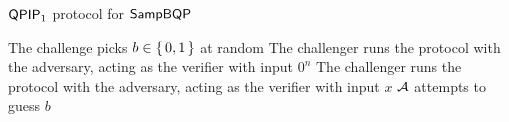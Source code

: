 \begin{algorithm}
	\caption{ $\operatorname{\mathsf{QPIP}}_1$ protocol for $\operatorname{\mathsf{SampBQP}}$}
	\label{ProtoIndCPA}
	\begin{algorithmic}[1]
		\State The challenge picks $b\in\set{0,1}$ at random
			\State The challenger runs the protocol with the adversary, acting as the verifier with input $0^n$
		\Else
			\State The challenger runs the protocol with the adversary, acting as the verifier with input $x$
		\EndIf
		\State $\mathcal{A}$ attempts to guess $b$
	\end{algorithmic}
\end{algorithm}
